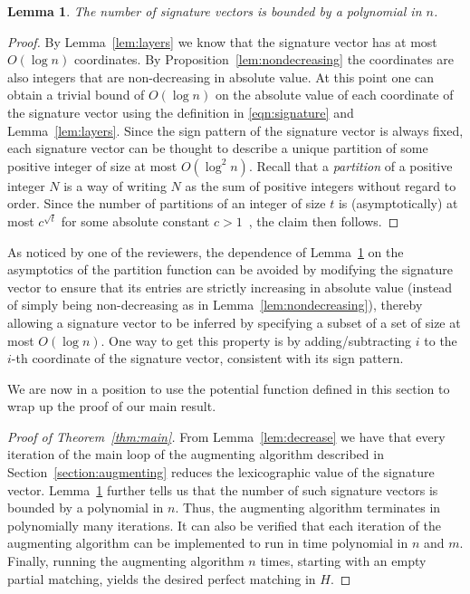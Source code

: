 \documentclass[11pt]{article}
\newtheorem{lemma}[theorem]{Lemma}
\theoremstyle{definition}
\theoremstyle{remark}
\begin{document}
\begin{lemma}\label{lem:sigs}
  The number of signature vectors is bounded by a polynomial in $n$.
\end{lemma}
\begin{proof}
  By Lemma~\ref{lem:layers} we know that the signature vector has at
  most $O(\log n)$ coordinates. By Proposition~\ref{lem:nondecreasing}
  the coordinates are also integers that are non-decreasing in
  absolute value. At this point one can obtain a trivial bound of
  $O(\log n)$ on the absolute value of each coordinate of the
  signature vector using the definition in
  \eqref{eqn:signature} and Lemma~\ref{lem:layers}. Since the sign
  pattern of the signature vector is always fixed, each signature
  vector can be thought to describe a unique partition of some
  positive integer of size at most $O(\log^2 n)$. Recall that a
  \emph{partition} of a positive integer $N$ is a way of writing $N$
  as the sum of positive integers without regard to order. Since the
  number of partitions of an integer of size $t$ is (asymptotically)
  at most $c^{\sqrt{t}}$ for some absolute constant
  $c > 1$~\cite{HardyRam18}, the claim then follows.
\end{proof}

As noticed by one of the reviewers, the dependence of
Lemma~\ref{lem:sigs} on the asymptotics of the partition function can
be avoided by modifying the signature vector to ensure that its
entries are strictly increasing in absolute value (instead of simply
being non-decreasing as in Lemma~\ref{lem:nondecreasing}), thereby
allowing a signature vector to be inferred by specifying a subset of a
set of size at most $O(\log n)$. One way to get this property is by
adding/subtracting $i$ to the $i$-th coordinate of the signature
vector, consistent with its sign pattern.

We are now in a position to use the potential function defined in this
section to wrap up the proof of our main result.

\begin{proof}[Proof of Theorem~\ref{thm:main}]
  From Lemma~\ref{lem:decrease} we have that every iteration of the main loop of the augmenting algorithm described in Section~\ref{section:augmenting} reduces the lexicographic value of the signature vector. Lemma~\ref{lem:sigs} further tells us that the number of such signature vectors is bounded by a polynomial in $n$. Thus, the augmenting algorithm terminates in polynomially many iterations. It can also be verified that each iteration of the augmenting algorithm can be implemented to run in time polynomial in $n$ and $m$. Finally, running the augmenting algorithm $n$ times, starting with an empty partial matching, yields the desired perfect matching in $H$.  \end{proof}
\end{document}
